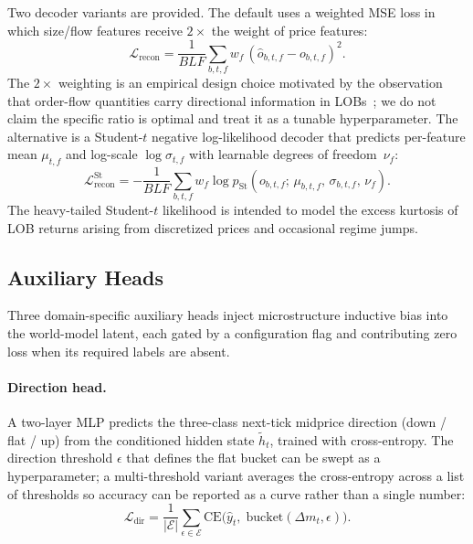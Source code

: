 \documentclass{article}
\begin{document}
Two decoder variants are provided.  The default uses a weighted MSE loss
in which size/flow features receive $2\times$ the weight of price
features:
\begin{equation}\label{eq:recon_mse}
  \mathcal{L}_{\text{recon}} = \frac{1}{BLF}
  \sum_{b,t,f} w_f\,(\hat{o}_{b,t,f} - o_{b,t,f})^2.
\end{equation}
The $2\times$ weighting is an empirical design choice motivated by the
observation that order-flow quantities carry directional information in
LOBs~\citep{cont2014price}; we do not claim the specific ratio is
optimal and treat it as a tunable hyperparameter.  The alternative is a
Student-$t$ negative log-likelihood decoder that predicts per-feature
mean $\mu_{t,f}$ and log-scale $\log\sigma_{t,f}$ with learnable degrees
of freedom~$\nu_f$:
\begin{equation}\label{eq:recon_studentt}
  \mathcal{L}_{\text{recon}}^{\text{St}} = -\frac{1}{BLF}
  \sum_{b,t,f} w_f \log p_{\text{St}}(o_{b,t,f};\,
  \mu_{b,t,f},\,\sigma_{b,t,f},\,\nu_f).
\end{equation}
The heavy-tailed Student-$t$ likelihood is intended to model the excess
kurtosis of LOB returns arising from discretized prices and occasional
regime jumps.

\subsection{Auxiliary Heads}\label{sec:aux_heads}

Three domain-specific auxiliary heads inject microstructure inductive
bias into the world-model latent, each gated by a configuration flag and
contributing zero loss when its required labels are absent.

\paragraph{Direction head.}
A two-layer MLP predicts the three-class next-tick midprice direction
(down / flat / up) from the conditioned hidden state $\tilde{h}_t$,
trained with cross-entropy.  The direction threshold $\epsilon$ that
defines the flat bucket can be swept as a hyperparameter; a
multi-threshold variant averages the cross-entropy across a list of
thresholds so accuracy can be reported as a curve rather than a single
number:
\begin{equation}
  \mathcal{L}_{\text{dir}} = \frac{1}{|\mathcal{E}|}
  \sum_{\epsilon \in \mathcal{E}}
  \mathrm{CE}\!\bigl(\hat{y}_t,\; \mathrm{bucket}(\Delta m_t, \epsilon)\bigr).
\end{equation}
\end{document}
